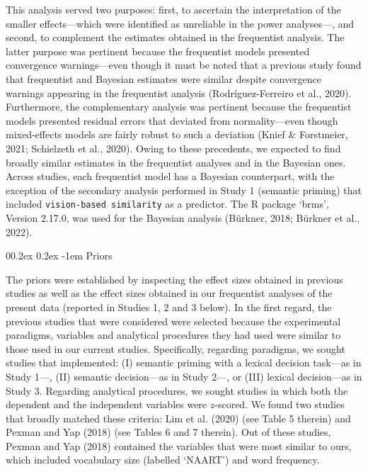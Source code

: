 \documentclass[
  12pt,
  man,floatsintext]{apa7}
\makeatletter
\let\oldparagraph\paragraph
\renewcommand{\paragraph}[1]{\oldparagraph{#1}\mbox{}}
\renewcommand{\paragraph}{\@startsection{paragraph}{4}{\parindent}%
  {0\baselineskip \@plus 0.2ex \@minus 0.2ex}%
  {-1em}%
  {\normalfont\normalsize\bfseries\itshape\typesectitle}}
\makeatother
\begin{document}
This analysis served two purposes: first, to ascertain the interpretation of the smaller effects---which were identified as unreliable in the power analyses---, and second, to complement the estimates obtained in the frequentist analysis. The latter purpose was pertinent because the frequentist models presented convergence warnings---even though it must be noted that a previous study found that frequentist and Bayesian estimates were similar despite convergence warnings appearing in the frequentist analysis (Rodríguez-Ferreiro et al., 2020). Furthermore, the complementary analysis was pertinent because the frequentist models presented residual errors that deviated from normality---even though mixed-effects models are fairly robust to such a deviation (Knief \& Forstmeier, 2021; Schielzeth et al., 2020). Owing to these precedents, we expected to find broadly similar estimates in the frequentist analyses and in the Bayesian ones. Across studies, each frequentist model has a Bayesian counterpart, with the exception of the secondary analysis performed in Study 1 (semantic priming) that included \texttt{vision-based\ similarity} as a predictor. The R package `brms', Version 2.17.0, was used for the Bayesian analysis (Bürkner, 2018; Bürkner et al., 2022).

\hypertarget{priors}{%
\paragraph{Priors}\label{priors}}

The priors were established by inspecting the effect sizes obtained in previous studies as well as the effect sizes obtained in our frequentist analyses of the present data (reported in Studies 1, 2 and 3 below). In the first regard, the previous studies that were considered were selected because the experimental paradigms, variables and analytical procedures they had used were similar to those used in our current studies. Specifically, regarding paradigms, we sought studies that implemented: (I) semantic priming with a lexical decision task---as in Study 1---, (II) semantic decision---as in Study 2---, or (III) lexical decision---as in Study 3. Regarding analytical procedures, we sought studies in which both the dependent and the independent variables were \(z\)-scored. We found two studies that broadly matched these criteria: Lim et al. (2020) (see Table 5 therein) and Pexman and Yap (2018) (see Tables 6 and 7 therein). Out of these studies, Pexman and Yap (2018) contained the variables that were most similar to ours, which included vocabulary size (labelled `NAART') and word frequency.
\end{document}
